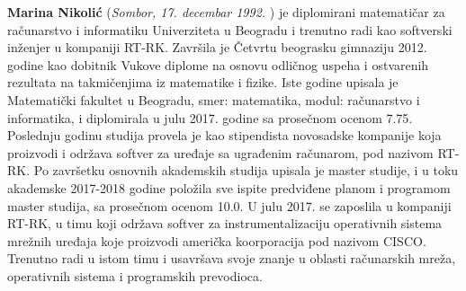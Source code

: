 \documentclass[12pt,oneside]{memoir}
\begin{document}
\literatura

\backmatter

\begin{biografija}
  \textbf{Marina Nikolić} (\emph{Sombor,
    17. decembar 1992. }) je diplomirani matematičar za računarstvo i informatiku Univerziteta u Beogradu i trenutno radi kao softverski inženjer u kompaniji RT-RK. Završila je Četvrtu beograsku gimnaziju 2012. godine kao dobitnik Vukove diplome na osnovu odličnog uspeha i ostvarenih rezultata na takmičenjima iz matematike i fizike. Iste godine upisala je Matematički fakultet  u Beogradu, smer: matematika, modul: računarstvo i informatika, i diplomirala u julu 2017. godine sa prosečnom ocenom 7.75. Poslednju godinu studija provela je kao stipendista novosadske kompanije koja proizvodi i održava softver za uređaje sa ugrađenim računarom, pod nazivom RT-RK. Po završetku osnovnih akademskih studija upisala je master studije, i u toku akademske 2017-2018 godine položila sve ispite predviđene planom i programom master studija, sa prosečnom ocenom 10.0. U julu 2017. se zaposlila u kompaniji RT-RK, u timu koji održava softver za instrumentalizaciju operativnih sistema mrežnih uređaja koje proizvodi američka koorporacija pod nazivom CISCO. Trenutno radi u istom timu i usavršava svoje znanje u oblasti računarskih mreža, operativnih sistema i programskih prevodioca. 
\end{biografija}
\end{document}
